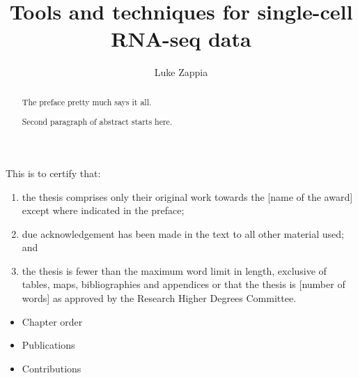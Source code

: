 \documentclass[11pt,a4paper,titlepage,twoside,openright]{style/unimelbthesis}
\title{Tools and techniques for single-cell RNA-seq data}
\author{Luke Zappia}
\theoremstyle{definition}
\theoremstyle{definition}
\theoremstyle{definition}
\theoremstyle{remark}
\begin{document}
\begin{frontmatter}


  \maketitle


  \begin{abstract}
    The preface pretty much says it all.
    
    \par
    
    Second paragraph of abstract starts here.
  \end{abstract}


  \begin{declaration}
    This is to certify that:
    
    \begin{enumerate}
    \def\labelenumi{\roman{enumi}.}
    \tightlist
    \item
      the thesis comprises only their original work towards the {[}name of the award{]} except where indicated in the preface;
    \item
      due acknowledgement has been made in the text to all other material used; and
    \item
      the thesis is fewer than the maximum word limit in length, exclusive of tables, maps, bibliographies and appendices or that the thesis is {[}number of words{]} as approved by the Research Higher Degrees Committee.
    \end{enumerate}
  \end{declaration}


  \begin{preface}
    \begin{itemize}
    \tightlist
    \item
      Chapter order
    \item
      Publications
    \item
      Contributions
    \end{itemize}
    

\end{preface}
\end{frontmatter}
\end{document}
